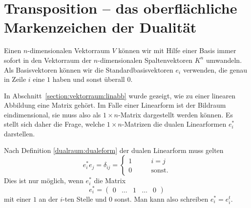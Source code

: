 %
%
%
\section{Transposition -- das oberflächliche Markenzeichen der Dualität%
\label{dualraum:section:transposition}}
Einen $n$-dimensionalen Vektorraum $V$ können wir mit Hilfe einer
Basis immer sofort in den Vektorraum der $n$-dimensionalen
Spaltenvektoren $K^n$ umwandeln.
Als Basisvektoren können wir die Standardbasisvektoren $e_i$ verwenden,
die genau in Zeile $i$ eine $1$ haben und sonst überall $0$.

In Abschnitt~\ref{section:vektorraum:linabb} wurde gezeigt, wie zu
einer linearen Abbildung eine Matrix gehört.
Im Falle einer Linearform ist der Bildraum eindimensional, sie muss
also als $1\times n$-Matrix dargestellt werden können.
Es stellt sich daher die Frage, welche $1\times n$-Matrizen die
dualen Linearformen $e_i^*$ darstellen.

Nach Definition \eqref{dualraum:dualeform} der dualen Linearform
muss gelten
\[
e_i^* e_j
=
\delta_{ij}
=
\begin{cases}
1&\qquad i=j\\
0&\qquad \text{sonst.}
\end{cases}
\]
Dies ist nur möglich, wenn $e_i^*$ die Matrix
\[
e_i^*
=
\begin{pmatrix}
0&\dots&1&\dots&0
\end{pmatrix}
\]
mit einer $1$ an der $i$-ten Stelle und $0$ sonst.
Man kann also schreiben $e_i^*=e_i^t$.

